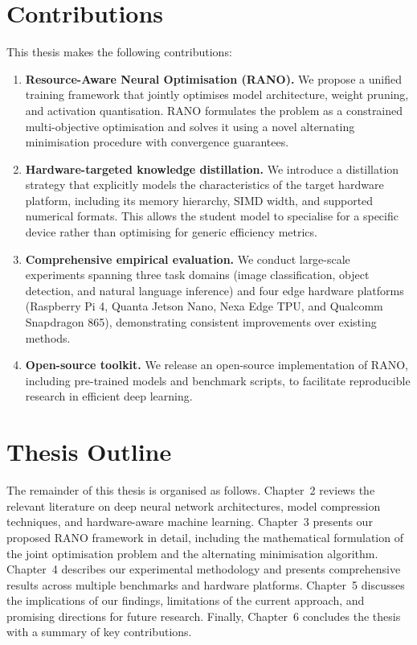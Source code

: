 \documentclass[12pt,a4paper,oneside]{book}
\begin{document}
\section{Contributions}

This thesis makes the following contributions:

\begin{enumerate}[label=\textbf{C\arabic*},leftmargin=3em]
  \item \textbf{Resource-Aware Neural Optimisation (RANO).} We propose a
  unified training framework that jointly optimises model architecture,
  weight pruning, and activation quantisation. RANO formulates the
  problem as a constrained multi-objective optimisation and solves it
  using a novel alternating minimisation procedure with convergence
  guarantees.

  \item \textbf{Hardware-targeted knowledge distillation.} We introduce a
  distillation strategy that explicitly models the characteristics of the
  target hardware platform, including its memory hierarchy, SIMD width,
  and supported numerical formats. This allows the student model to
  specialise for a specific device rather than optimising for generic
  efficiency metrics.

  \item \textbf{Comprehensive empirical evaluation.} We conduct
  large-scale experiments spanning three task domains (image
  classification, object detection, and natural language inference)
  and four edge hardware platforms (Raspberry Pi 4, Quanta Jetson Nano,
  Nexa Edge TPU, and Qualcomm Snapdragon 865), demonstrating consistent
  improvements over existing methods.

  \item \textbf{Open-source toolkit.} We release an open-source
  implementation of RANO, including pre-trained models and benchmark
  scripts, to facilitate reproducible research in efficient deep
  learning.
\end{enumerate}

\section{Thesis Outline}

The remainder of this thesis is organised as follows. Chapter~2 reviews
the relevant literature on deep neural network architectures, model
compression techniques, and hardware-aware machine learning. Chapter~3
presents our proposed RANO framework in detail, including the
mathematical formulation of the joint optimisation problem and the
alternating minimisation algorithm. Chapter~4 describes our experimental
methodology and presents comprehensive results across multiple benchmarks
and hardware platforms. Chapter~5 discusses the implications of our
findings, limitations of the current approach, and promising directions
for future research. Finally, Chapter~6 concludes the thesis with a
summary of key contributions.
\end{document}
